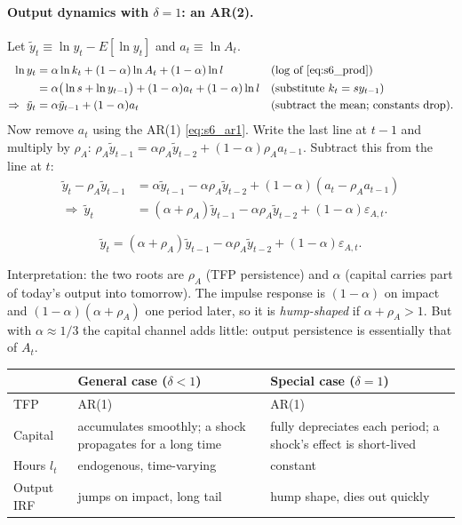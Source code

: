 \paragraph{Output dynamics with $\delta=1$: an AR(2).} Let $\tilde y_t\equiv\ln y_t-E[\ln y_t]$ and $a_t\equiv\ln A_t$.
\begin{align*}
\ln y_t&=\alpha\ln k_t+(1-\alpha)\ln A_t+(1-\alpha)\ln l &&\text{(log of \eqref{eq:s6_prod})}\\
&=\alpha\big(\ln s+\ln y_{t-1}\big)+(1-\alpha)a_t+(1-\alpha)\ln l &&\text{(substitute }k_t=sy_{t-1})\\
\Rightarrow\ \tilde y_t&=\alpha\tilde y_{t-1}+(1-\alpha)a_t &&\text{(subtract the mean; constants drop).}
\end{align*}
Now remove $a_t$ using the AR(1) \eqref{eq:s6_ar1}. Write the last line at $t-1$ and multiply by $\rho_A$: $\rho_A\tilde y_{t-1}=\alpha\rho_A\tilde y_{t-2}+(1-\alpha)\rho_Aa_{t-1}$. Subtract this from the line at $t$:
\begin{align*}
\tilde y_t-\rho_A\tilde y_{t-1}&=\alpha\tilde y_{t-1}-\alpha\rho_A\tilde y_{t-2}+(1-\alpha)(a_t-\rho_Aa_{t-1})\\
\Rightarrow\ \tilde y_t&=(\alpha+\rho_A)\tilde y_{t-1}-\alpha\rho_A\tilde y_{t-2}+(1-\alpha)\varepsilon_{A,t}.
\end{align*}
\begin{keybox}[title={Output is AR(2) when $\delta=1$}]
\[
\tilde y_t=(\alpha+\rho_A)\tilde y_{t-1}-\alpha\rho_A\tilde y_{t-2}+(1-\alpha)\varepsilon_{A,t}.
\]
\end{keybox}
Interpretation: the two roots are $\rho_A$ (TFP persistence) and $\alpha$ (capital carries part of today's output into tomorrow). The impulse response is $(1-\alpha)$ on impact and $(1-\alpha)(\alpha+\rho_A)$ one period later, so it is \emph{hump-shaped} if $\alpha+\rho_A>1$. But with $\alpha\approx1/3$ the capital channel adds little: output persistence is essentially that of $A_t$.

\begin{center}
\renewcommand{\arraystretch}{1.15}
\begin{tabular}{p{2.2cm}p{6cm}p{6cm}}
\hline
 & General case ($\delta<1$) & Special case ($\delta=1$)\\\hline
TFP & AR(1) & AR(1)\\
Capital & accumulates smoothly; a shock propagates for a long time & fully depreciates each period; a shock's effect is short-lived\\
Hours $l_t$ & endogenous, time-varying & constant\\
Output IRF & jumps on impact, long tail & hump shape, dies out quickly\\\hline
\end{tabular}
\end{center}

